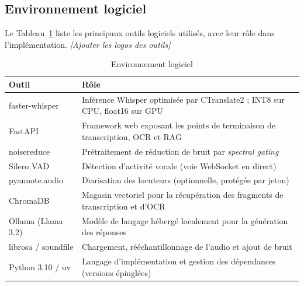 \documentclass[12pt]{report}
\newcommand{\todo}[1]{\textsl{\colorbox[rgb]{1,1,0}{#1}}}
\begin{document}
\subsection{Environnement logiciel}
Le Tableau~\ref{tab:software} liste les principaux outils logiciels utilisés, avec leur rôle dans l'implémentation. \todo{[Ajouter les logos des outils]}
\begin{table}[H]
\centering
\small
\begin{tabular}{|l|p{9.5cm}|}
\hline
\textbf{Outil} & \textbf{Rôle} \\ \hline
faster-whisper & Inférence Whisper optimisée par CTranslate2 ; INT8 sur CPU, float16 sur GPU \\ \hline
FastAPI & Framework web exposant les points de terminaison de transcription, OCR et RAG \\ \hline
noisereduce & Prétraitement de réduction de bruit par \textit{spectral gating} \\ \hline
Silero VAD & Détection d'activité vocale (voie WebSocket en direct) \\ \hline
pyannote.audio & Diarisation des locuteurs (optionnelle, protégée par jeton) \\ \hline
ChromaDB & Magasin vectoriel pour la récupération des fragments de transcription et d'OCR \\ \hline
Ollama (Llama 3.2) & Modèle de langage hébergé localement pour la génération des réponses \\ \hline
librosa / soundfile & Chargement, rééchantillonnage de l'audio et ajout de bruit \\ \hline
Python 3.10 / uv & Langage d'implémentation et gestion des dépendances (versions épinglées) \\ \hline
\end{tabular}
\caption{Environnement logiciel}
\label{tab:software}
\end{table}
\end{document}
